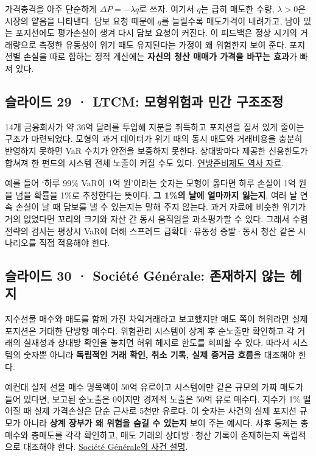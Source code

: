 \documentclass[11pt,a4paper]{article}
\begin{document}
가격충격을 아주 단순하게 $\Delta P=-\lambda q$로 쓰자. 여기서 $q$는 급히 매도한 수량, $\lambda>0$은 시장의 얕음을 나타낸다. 담보 요청 때문에 $q$를 늘릴수록 매도가격이 내려가고, 남아 있는 포지션에도 평가손실이 생겨 다시 담보 요청이 커진다. 이 피드백은 정상 시기의 거래량으로 측정한 유동성이 위기 때도 유지된다는 가정이 왜 위험한지 보여 준다. 포지션별 손실을 따로 합하는 정적 계산에는 \textbf{자신의 청산 매매가 가격을 바꾸는 효과}가 빠져 있다.\par

\subsection{슬라이드 29 · LTCM: 모형위험과 민간 구조조정}
14개 금융회사가 약 36억 달러를 투입해 지분을 취득하고 포지션을 질서 있게 줄이는 구조가 마련되었다. 모형의 과거 데이터가 위기 때의 동시 매도와 거래비용을 충분히 반영하지 못하면 VaR 수치가 안전을 보증하지 못한다. 상대방마다 제공한 신용한도가 합쳐져 한 펀드의 시스템 전체 노출이 커질 수도 있다. \href{https://www.federalreservehistory.org/essays/ltcm-near-failure}{연방준비제도 역사 자료}.\par

예를 들어 ‘하루 99\% VaR이 1억 원’이라는 숫자는 모형이 옳다면 하루 손실이 1억 원을 넘을 확률을 1\%로 추정한다는 뜻이다. \textbf{그 1\%의 날에 얼마까지 잃는지}, 여러 날 연속 손실이 날 때 담보를 낼 수 있는지는 말해 주지 않는다. 과거 자료에 비슷한 위기가 거의 없었다면 꼬리의 크기와 자산 간 동시 움직임을 과소평가할 수 있다. 그래서 수렴 전략의 검사는 평상시 VaR에 더해 스프레드 급확대·유동성 증발·동시 청산 같은 시나리오를 직접 적용해야 한다.\par

\subsection{슬라이드 30 · Société Générale: 존재하지 않는 헤지}
지수선물 매수와 매도를 함께 가진 차익거래라고 보고했지만 매도 쪽이 허위라면 실제 포지션은 거대한 단방향 매수다. 위험관리 시스템이 상계 후 순노출만 확인하고 각 거래의 실재성과 상대방 확인을 놓치면 허위 헤지로 한도를 회피할 수 있다. 따라서 시스템의 숫자뿐 아니라 \textbf{독립적인 거래 확인, 취소 기록, 실제 증거금 흐름}을 대조해야 한다.\par

예컨대 실제 선물 매수 명목액이 50억 유로이고 시스템에만 같은 규모의 가짜 매도가 들어 있다면, 보고된 순노출은 0이지만 경제적 노출은 50억 유로 매수다. 지수가 1\% 떨어질 때 실제 가격손실은 단순 근사로 5천만 유로다. 이 숫자는 사건의 실제 포지션 규모가 아니라 \textbf{상계 장부가 왜 위험을 숨길 수 있는지} 보여 주는 예시다. 사후 통제는 총매수와 총매도를 각각 확인하고, 매도 거래의 상대방·청산 기록이 존재하는지 독립적으로 대조해야 한다. \href{https://www.societegenerale.com/en/news/newsroom/explanatory-note-about-exceptional-fraud}{Société Générale의 사건 설명}.\par
\end{document}
